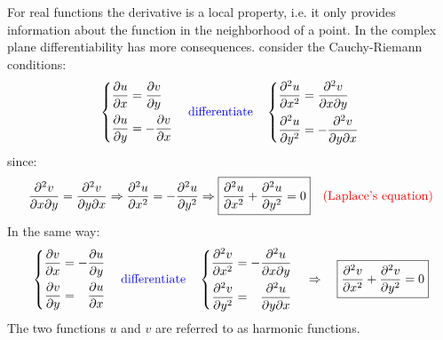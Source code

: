 \documentclass{article}
\begin{document}
\noindent
For real functions the derivative is a local property, i.e. it only provides information about the function in the neighborhood of a point. In the complex plane differentiability has more consequences. consider the Cauchy-Riemann conditions:
\begin{equation}
    \left\{
\begin{aligned}
\frac{\partial u}{\partial x} &= \frac{\partial v}{\partial y} \\
\frac{\partial u}{\partial y} &= -\frac{\partial v}{\partial x}
\end{aligned}
\right.
\quad
\textcolor{blue}{\text{differentiate}}
\quad
\left\{
\begin{aligned}
\frac{\partial^2 u}{\partial x^2} &= \frac{\partial^2 v}{\partial x \partial y} \\
\frac{\partial^2 u}{\partial y^2} &= -\frac{\partial^2 v}{\partial y \partial x}
\end{aligned}
\right.
\end{equation}
since:
\begin{equation}
    \frac{\partial^2 v}{\partial x \partial y} = \frac{\partial^2 v}{\partial y \partial x}
\Rightarrow
\frac{\partial^2 u}{\partial x^2} = -\frac{\partial^2 u}{\partial y^2}
\Rightarrow
\boxed{
\frac{\partial^2 u}{\partial x^2} + \frac{\partial^2 u}{\partial y^2} = 0
} \quad \color{red}\text{(Laplace's equation)} \color{black}
\end{equation}
In the same way:
\begin{align}
    \left\{
\begin{aligned}
\frac{\partial v}{\partial x} &= -\frac{\partial u}{\partial y} \\
\frac{\partial v}{\partial y} &= \phantom{-}\frac{\partial u}{\partial x}
\end{aligned}
\right.
\quad
\textcolor{blue}{\text{differentiate}}
\quad
\left\{
\begin{aligned}
\frac{\partial^2 v}{\partial x^2} &= -\frac{\partial^2 u}{\partial x \partial y} \\
\frac{\partial^2 v}{\partial y^2} &= \phantom{-}\frac{\partial^2 u}{\partial y \partial x}
\end{aligned}
\right. \quad
\Rightarrow \quad
\boxed{
\frac{\partial^2 v}{\partial x^2} + \frac{\partial^2 v}{\partial y^2} = 0
}
\end{align}
The two functions $u$ and $v$ are referred to as harmonic functions.
\end{document}
